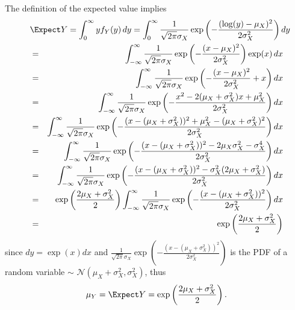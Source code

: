 The definition of the expected value implies
\begin{eqnarray*}
\lefteqn{
\Expect Y = \int_{0}^{\infty} y f_Y(y) \, dy
= \int_{0}^{\infty} \frac{1}{\sqrt{2\pi} \sigma_X }  \exp\left(-\frac{(\log(y)-\mu_X)^2}{2\sigma_X^2}\right) dy
}
\\
&=&
\int_{-\infty}^{\infty} \frac{1}{\sqrt{2\pi} \sigma_X }  \exp\left(-\frac{(x-\mu_X)^2}{2\sigma_X^2}\right) \exp(x) \, dx
\\
&=&
\int_{-\infty}^{\infty} \frac{1}{\sqrt{2\pi} \sigma_X }  \exp\left(-\frac{(x-\mu_X)^2}{2\sigma_X^2}+x\right) dx
\\
&=&
\int_{-\infty}^{\infty} \frac{1}{\sqrt{2\pi} \sigma_X }  \exp\left(-\frac{x^2 - 2(\mu_X +\sigma_X^2)x + \mu_X^2}{2\sigma_X^2}\right) dx
\\
&=&
\int_{-\infty}^{\infty} \frac{1}{\sqrt{2\pi} \sigma_X }  \exp\left(-\frac{(x - (\mu_X +\sigma_X^2))^2 + \mu_X^2 -(\mu_X+\sigma_X^2)^2}{2\sigma_X^2}\right) dx
\\
&=&
\int_{-\infty}^{\infty} \frac{1}{\sqrt{2\pi} \sigma_X }  \exp\left(-\frac{(x - (\mu_X +\sigma_X^2))^2 - 2\mu_X\sigma_X^2 - \sigma_X^4}{2\sigma_X^2}\right) dx
\\
&=&
\int_{-\infty}^{\infty} \frac{1}{\sqrt{2\pi} \sigma_X }  \exp\left(-\frac{(x - (\mu_X +\sigma_X^2))^2 - \sigma_X^2(2\mu_X+ \sigma_X^2)}{2\sigma_X^2}\right) dx
\\
&=&
\exp\left(\frac{2\mu_X+ \sigma_X^2}{2}\right)
\int_{-\infty}^{\infty} \frac{1}{\sqrt{2\pi} \sigma_X }  \exp\left(-\frac{(x - (\mu_X +\sigma_X^2))^2 }{2\sigma_X^2}\right) dx
\\
&=&
\exp\left(\frac{2\mu_X+ \sigma_X^2}{2}\right)
\end{eqnarray*}
since $dy = \exp(x) dx$
and $\frac{1}{\sqrt{2\pi} \sigma_X }  \exp\left(-\frac{(x - (\mu_X +\sigma_X^2))^2 }{2\sigma_X^2}\right)$
is the PDF of a random variable $\sim$ $\mathcal{N}(\mu_X+\sigma_X^2,\sigma_X^2)$,
thus
\begin{equation}
\label{eq:log-normal-mean}
\mu_Y
= \Expect Y = \exp\left(\frac{2\mu_X+ \sigma_X^2}{2}\right).
\end{equation}

